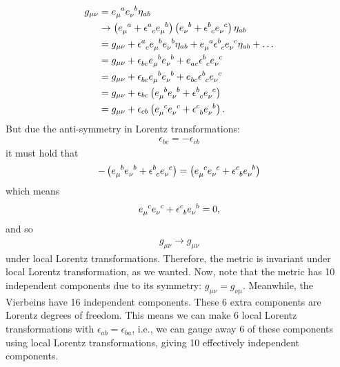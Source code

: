 \documentclass{book}
\numberwithin{equation}{section}
\theoremstyle{definition}
\newcommand{\lp}{\left(}
\newcommand{\rp}{\right)}
\begin{document}
\begin{align}
g_{\mu\nu} &= \tensor{e}{_\mu^a}\tensor{e}{_\nu^b}\eta_{ab}\\
&\to \lp \tensor{e}{_\mu^a} + \tensor{\epsilon}{^a_c}\tensor{e}{_\mu^b} \rp
\lp \tensor{e}{_\nu^b} + \tensor{\epsilon}{^b_c}\tensor{e}{_\nu^c} \rp\eta_{ab}\\
&= g_{\mu\nu} + \tensor{\epsilon}{^a_c}\tensor{e}{_\mu^b}\tensor{e}{_\nu^b}\eta_{ab} +  \tensor{e}{_\mu^a}\tensor{\epsilon}{^b_c}\tensor{e}{_\nu^c}\eta_{ab} + \dots\\
&= g_{\mu\nu} + \tensor{\epsilon}{_{bc}}\tensor{e}{_\mu^b}\tensor{e}{_\nu^b} +  \tensor{e}{_{ac}}\tensor{\epsilon}{^b_c}\tensor{e}{_\nu^c}\\
&= g_{\mu\nu} + \tensor{\epsilon}{_{bc}}\tensor{e}{_\mu^b}\tensor{e}{_\nu^b} +  \tensor{e}{_{bc}}\tensor{\epsilon}{^b_c}\tensor{e}{_\nu^c}\\
&= g_{\mu\nu} + \epsilon_{bc}\lp \tensor{e}{_\mu^b}\tensor{e}{_\nu^b} + \tensor{\epsilon}{^b_c}\tensor{e}{_\nu^c}\rp\\
&= g_{\mu\nu} + \epsilon_{cb}\lp \tensor{e}{_\mu^c}\tensor{e}{_\nu^c} + \tensor{\epsilon}{^c_b}\tensor{e}{_\nu^b}\rp.
\end{align}
But due the anti-symmetry in Lorentz transformations:
\begin{align}
\epsilon_{bc} = -\epsilon_{cb}
\end{align}
it must hold that 
\begin{align}
-\lp \tensor{e}{_\mu^b}\tensor{e}{_\nu^b} + \tensor{\epsilon}{^b_c}\tensor{e}{_\nu^c}\rp = \lp \tensor{e}{_\mu^c}\tensor{e}{_\nu^c} + \tensor{\epsilon}{^c_b}\tensor{e}{_\nu^b}\rp
\end{align}
which means
\begin{align}
\tensor{e}{_\mu^c}\tensor{e}{_\nu^c} + \tensor{\epsilon}{^c_b}\tensor{e}{_\nu^b} = 0,
\end{align}
and so
\begin{align}
g_{\mu\nu} \to g_{\mu\nu}
\end{align}
under local Lorentz transformations. Therefore, the metric is invariant under local Lorentz transformation, as we wanted. Now, note that the metric has 10 independent components due to its symmetry: $g_{\mu\nu} = g_{\nu\mu}$. Meanwhile, the Vierbeins have 16 independent components. These 6 extra components are Lorentz degrees of freedom. This means we can make 6 local Lorentz transformations with $\epsilon_{ab} = \epsilon_{ba}$, i.e., we can gauge away 6 of these components using local Lorentz transformations, giving 10 effectively independent components. 
\end{document}
